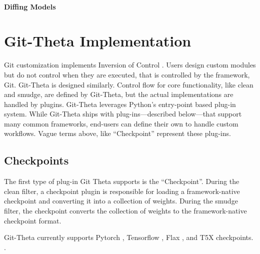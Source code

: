 \paragraph{Diffing Models}


\section{Git-Theta Implementation} \label{sec:implementation}

Git customization implements Inversion of Control . Users design custom modules but do not control when they are executed, that is controlled by the framework, Git. Git-Theta is designed similarly. Control flow for core functionality, like clean and smudge, are defined by Git-Theta, but the actual implementations are handled by plugins. Git-Theta leverages Python's  entry-point based plug-in system. While Git-Theta ships with plug-ins---described below---that support many common frameworks, end-users can define their own to handle custom workflows. Vague terms above, like ``Checkpoint'' represent these plug-ins.

\subsection{Checkpoints}

The first type of plug-in Git Theta supports is the ``Checkpoint''. During the clean filter, a checkpoint plugin is responsible for loading a framework-native checkpoint and converting it into a collection of weights. During the smudge filter, the checkpoint converts the collection of weights to the framework-native checkpoint format.

Git-Theta currently supports Pytorch , Tensorflow , Flax , and T5X  checkpoints. .




